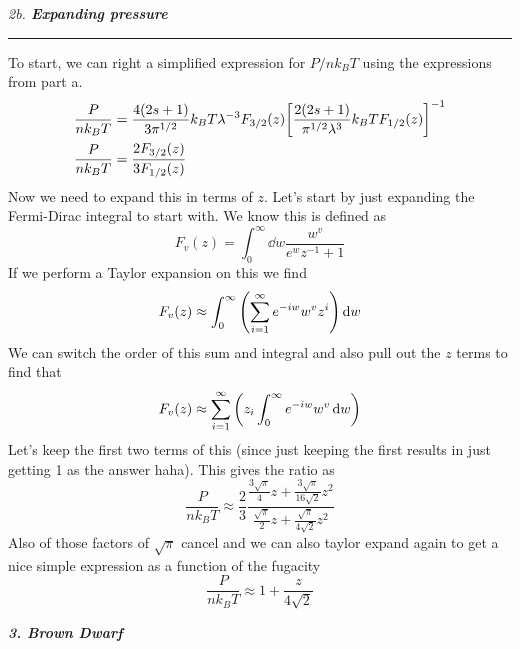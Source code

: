 \documentclass[12pt, letterpaper, twoside]{article}
\newcommand{\question}[1]{{\noindent \it #1}}
\newcommand{\answer}[1]{
    \par\noindent\rule{\textwidth}{0.4pt}#1\vspace{0.5cm}
}
\begin{document}
\question{2b. \textbf{Expanding pressure}}
\answer{
    To start, we can right a simplified expression for $P / n k_B T$ using the expressions from part a.
    \begin{align}
        \frac{P}{n k_B T} &= \frac{4(2s + 1)}{3 \pi^{1/2}} k_B T \lambda^{-3} F_{3/2}(z) \qty[\frac{2(2s + 1)}{\pi^{1/2} \lambda^3} k_B T F_{1/2}(z)]^{-1} \\
        \frac{P}{n k_B T} &= \frac{2 F_{3/2}(z)}{3 F_{1/2}(z)}
    \end{align}
    Now we need to expand this in terms of $z$. Let's start by just expanding the Fermi-Dirac integral to start with. We know this is defined as
    \begin{equation}
        F_v(z) = \int_0^\infty \dd{w} \frac{w^v}{e^w z^{-1} + 1}
    \end{equation}
    If we perform a Taylor expansion on this we find
    \begin{equation}
        F_v(z) \approx \int_0^\infty \qty(\sum_{i = 1}^{\infty} e^{- i w} w^v z^i) \dd{w}
    \end{equation}
    We can switch the order of this sum and integral and also pull out the $z$ terms to find that
    \begin{equation}
        F_v(z) \approx \sum_{i = 1}^{\infty} \qty( z_i \int_0^\infty e^{- i w} w^v \dd{w} )
    \end{equation}
    Let's keep the first two terms of this (since just keeping the first results in just getting 1 as the answer haha). This gives the ratio as
    \begin{equation}
        \frac{P}{n k_B T} \approx \frac{2}{3} \frac{\frac{3 \sqrt{\pi}}{4} z + \frac{3 \sqrt{\pi}}{16 \sqrt{2}} z^2}{\frac{\sqrt{\pi}}{2} z + \frac{\sqrt{\pi}}{4 \sqrt{2}} z^2}
    \end{equation}
    Also of those factors of $\sqrt{\pi}$ cancel and we can also taylor expand again to get a nice simple expression as a function of the fugacity
    \begin{equation}
        \boxed{ \frac{P}{n k_B T} \approx 1 + \frac{z}{4 \sqrt{2}} }
    \end{equation}
}

\question{\textbf{3. Brown Dwarf}}
\end{document}
